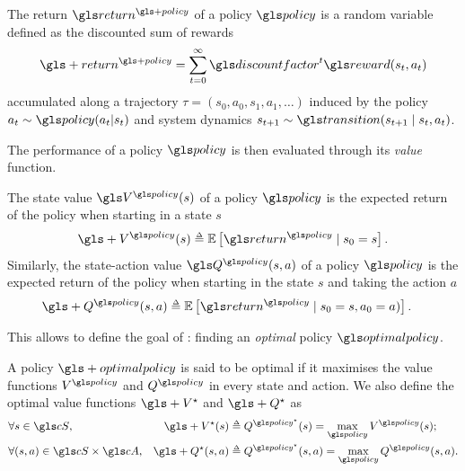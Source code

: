 \begin{definition}
	\begin{leftbar}[defnbar]
	The {return} $\return^{\gls+{policy}}$ of a policy $\policy$ is a random variable defined as the discounted sum of rewards 
	\begin{equation*}
	\gls+{return}^{\gls+{policy}} = \sum_{t=0}^\infty \discount^t \R(s_t, a_t)
	\end{equation*}
	accumulated along a trajectory $\tau = (s_0, a_0, s_1, a_1, \dots)$ induced by the policy $a_t\sim \policy(a_t|s_t)$ and system dynamics $s_{t+1}\sim \Ps(s_{t+1} \mid s_t, a_t)$.
	\end{leftbar}
\end{definition}

The performance of a policy $\policy$ is then evaluated through its \emph{value} function. 
\begin{definition}
	\begin{leftbar}[defnbar]
	\label{def:value-functions}
	The state value $\V^\policy(s)$ of a policy $\policy$ is the expected return of the policy when starting in a state $s$
	\begin{align*}
	\gls+{V}^\policy(s) \eqdef \expectedvalue\left[ \return^\policy \mid s_0=s\right].
	\end{align*}
	Similarly, the state-action value $\Q^\policy(s, a)$ of a policy $\policy$ is the expected return of the policy when starting in the state $s$ and taking the action $a$
	\begin{align*}
	\gls+{Q}^\policy(s, a) &\eqdef \expectedvalue\left[ \return^\policy \mid s_0=s, a_0 = a)\right].
	\end{align*}
	\end{leftbar}
\end{definition}

This allows to define the goal of : finding an \emph{optimal} policy $\optimalpolicy$.

\begin{definition}[Optimality]
	\begin{leftbar}[defnbar]
	\label{def:optimality}
	A policy $\gls+{optimalpolicy}$ is said to be optimal if it maximises the value functions $V^\policy$ and $Q^\policy$ in every state and action.
	We also define the optimal value functions $\gls+{V}^\star$ and $\gls+{Q}^\star$ as 
	\begin{align*}
	&\forall s\in \cS, & \gls+{V}^\star(s) &\eqdef Q^{\policy^\star}(s) = \max_\policy V^\policy(s);\\
	&\forall (s,a)\in \cS\times\cA,& \gls+{Q}^\star(s, a) &\eqdef Q^{\policy^\star}(s, a) = \max_\policy Q^\policy(s, a).
	\end{align*}
	\end{leftbar}
\end{definition}

